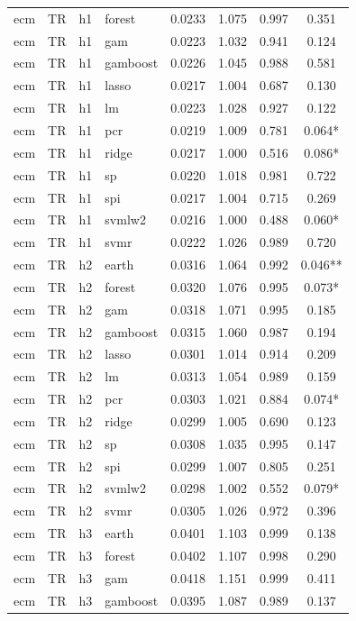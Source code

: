 \begin{ThreePartTable}
\begin{longtable}[t]{llclcccc}
ecm & TR & h1 & forest & 0.0233 & 1.075 & 0.997 & 0.351\\
ecm & TR & h1 & gam & 0.0223 & 1.032 & 0.941 & 0.124\\
ecm & TR & h1 & gamboost & 0.0226 & 1.045 & 0.988 & 0.581\\
ecm & TR & h1 & lasso & 0.0217 & 1.004 & 0.687 & 0.130\\
ecm & TR & h1 & lm & 0.0223 & 1.028 & 0.927 & 0.122\\
ecm & TR & h1 & pcr & 0.0219 & 1.009 & 0.781 & 0.064*\\
ecm & TR & h1 & ridge & 0.0217 & 1.000 & 0.516 & 0.086*\\
ecm & TR & h1 & sp & 0.0220 & 1.018 & 0.981 & 0.722\\
ecm & TR & h1 & spi & 0.0217 & 1.004 & 0.715 & 0.269\\
ecm & TR & h1 & svmlw2 & 0.0216 & 1.000 & 0.488 & 0.060*\\
ecm & TR & h1 & svmr & 0.0222 & 1.026 & 0.989 & 0.720\\
\addlinespace
ecm & TR & h2 & earth & 0.0316 & 1.064 & 0.992 & 0.046**\\
ecm & TR & h2 & forest & 0.0320 & 1.076 & 0.995 & 0.073*\\
ecm & TR & h2 & gam & 0.0318 & 1.071 & 0.995 & 0.185\\
ecm & TR & h2 & gamboost & 0.0315 & 1.060 & 0.987 & 0.194\\
ecm & TR & h2 & lasso & 0.0301 & 1.014 & 0.914 & 0.209\\
ecm & TR & h2 & lm & 0.0313 & 1.054 & 0.989 & 0.159\\
ecm & TR & h2 & pcr & 0.0303 & 1.021 & 0.884 & 0.074*\\
ecm & TR & h2 & ridge & 0.0299 & 1.005 & 0.690 & 0.123\\
ecm & TR & h2 & sp & 0.0308 & 1.035 & 0.995 & 0.147\\
ecm & TR & h2 & spi & 0.0299 & 1.007 & 0.805 & 0.251\\
ecm & TR & h2 & svmlw2 & 0.0298 & 1.002 & 0.552 & 0.079*\\
ecm & TR & h2 & svmr & 0.0305 & 1.026 & 0.972 & 0.396\\
\addlinespace
ecm & TR & h3 & earth & 0.0401 & 1.103 & 0.999 & 0.138\\
ecm & TR & h3 & forest & 0.0402 & 1.107 & 0.998 & 0.290\\
ecm & TR & h3 & gam & 0.0418 & 1.151 & 0.999 & 0.411\\
ecm & TR & h3 & gamboost & 0.0395 & 1.087 & 0.989 & 0.137\\

\end{longtable}
\end{ThreePartTable}
